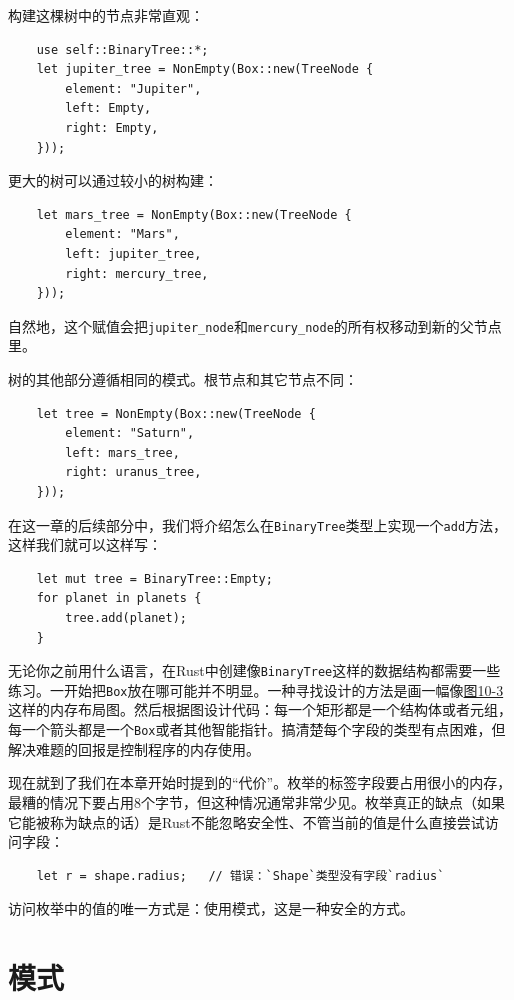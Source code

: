 构建这棵树中的节点非常直观：
\begin{verbatim}
    use self::BinaryTree::*;
    let jupiter_tree = NonEmpty(Box::new(TreeNode {
        element: "Jupiter",
        left: Empty,
        right: Empty,
    }));
\end{verbatim}

更大的树可以通过较小的树构建：
\begin{verbatim}
    let mars_tree = NonEmpty(Box::new(TreeNode {
        element: "Mars",
        left: jupiter_tree,
        right: mercury_tree,
    }));
\end{verbatim}

自然地，这个赋值会把\texttt{jupiter\_node}和\texttt{mercury\_node}的所有权移动到新的父节点里。

树的其他部分遵循相同的模式。根节点和其它节点不同：
\begin{verbatim}
    let tree = NonEmpty(Box::new(TreeNode {
        element: "Saturn",
        left: mars_tree,
        right: uranus_tree,
    }));
\end{verbatim}

在这一章的后续部分中，我们将介绍怎么在\texttt{BinaryTree}类型上实现一个\texttt{add}方法，这样我们就可以这样写：
\begin{verbatim}
    let mut tree = BinaryTree::Empty;
    for planet in planets {
        tree.add(planet);
    }
\end{verbatim}

无论你之前用什么语言，在Rust中创建像\texttt{BinaryTree}这样的数据结构都需要一些练习。一开始把\texttt{Box}放在哪可能并不明显。一种寻找设计的方法是画一幅像\hyperref[f10-3]{图10-3}这样的内存布局图。然后根据图设计代码：每一个矩形都是一个结构体或者元组，每一个箭头都是一个\texttt{Box}或者其他智能指针。搞清楚每个字段的类型有点困难，但解决难题的回报是控制程序的内存使用。 

现在就到了我们在本章开始时提到的“代价”。枚举的标签字段要占用很小的内存，最糟的情况下要占用8个字节，但这种情况通常非常少见。枚举真正的缺点（如果它能被称为缺点的话）是Rust不能忽略安全性、不管当前的值是什么直接尝试访问字段：
\begin{verbatim}
    let r = shape.radius;   // 错误：`Shape`类型没有字段`radius`
\end{verbatim}

访问枚举中的值的唯一方式是：使用模式，这是一种安全的方式。

\section{模式}

